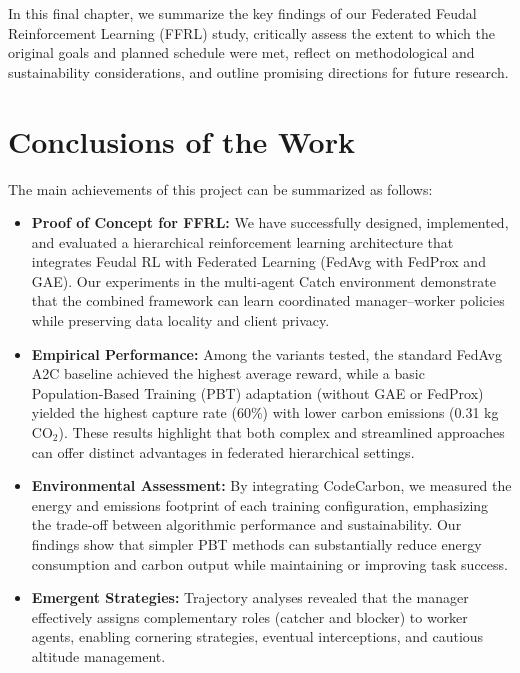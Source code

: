 \documentclass[12pt,a4paper,twoside,openany]{book}
\begin{document}
In this final chapter, we summarize the key findings of our Federated Feudal Reinforcement Learning (FFRL) study, critically assess the extent to which the original goals and planned schedule were met, reflect on methodological and sustainability considerations, and outline promising directions for future research.

\section{Conclusions of the Work}
The main achievements of this project can be summarized as follows:
\begin{itemize}
  \item \textbf{Proof of Concept for FFRL:} We have successfully designed, implemented, and evaluated a hierarchical reinforcement learning architecture that integrates Feudal RL with Federated Learning (FedAvg with FedProx and GAE). Our experiments in the multi‑agent Catch environment demonstrate that the combined framework can learn coordinated manager–worker policies while preserving data locality and client privacy.
  \item \textbf{Empirical Performance:} Among the variants tested, the standard FedAvg A2C baseline achieved the highest average reward, while a basic Population‑Based Training (PBT) adaptation (without GAE or FedProx) yielded the highest capture rate (60\%) with lower carbon emissions (0.31 kg CO$_2$). These results highlight that both complex and streamlined approaches can offer distinct advantages in federated hierarchical settings.
  \item \textbf{Environmental Assessment:} By integrating CodeCarbon, we measured the energy and emissions footprint of each training configuration, emphasizing the trade‑off between algorithmic performance and sustainability. Our findings show that simpler PBT methods can substantially reduce energy consumption and carbon output while maintaining or improving task success.
  \item \textbf{Emergent Strategies:} Trajectory analyses revealed that the manager effectively assigns complementary roles (catcher and blocker) to worker agents, enabling cornering strategies, eventual interceptions, and cautious altitude management.
\end{itemize}
\end{document}

